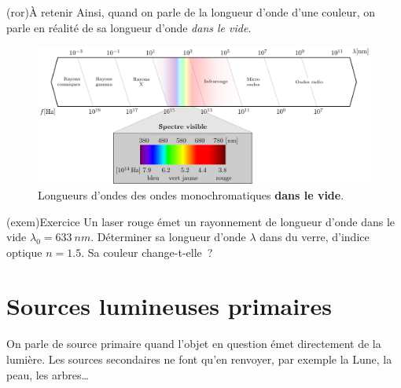 \documentclass[../../main/main.tex]{subfiles}
\begin{document}
\begin{tcb}(ror){À retenir}
	Ainsi, quand on parle de la longueur d'onde d'une couleur, on parle en réalité
	de sa longueur d'onde \textit{dans le vide}.
\end{tcb}

\begin{figure}[h]
	\centering
	\includegraphics[width=.9\linewidth]{full_spectre}
	\caption{Longueurs d'ondes des ondes monochromatiques \textbf{dans le vide}.}
	\label{fig:lambda_vis}
\end{figure}

\begin{tcb}(exem){Exercice}
	Un laser rouge émet un rayonnement de longueur d'onde dans le vide
	$\lambda_0 = \SI{633}{nm}$. Déterminer sa longueur d'onde $\lambda$ dans du
	verre, d'indice optique $n = \num{1.5}$. Sa couleur change-t-elle~?
	\tcblower
\end{tcb}

\section{Sources lumineuses primaires}

On parle de source primaire quand l'objet en question émet directement de la
lumière. Les sources secondaires ne font qu'en renvoyer, par exemple la Lune, la
peau, les arbres…
\end{document}

